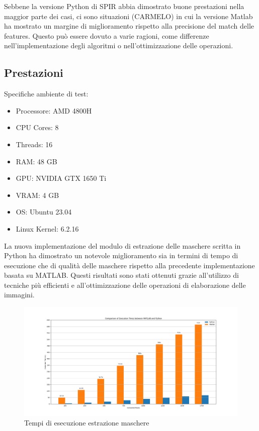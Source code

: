 \documentclass[a4paper,12pt]{report}
\begin{document}
    Sebbene la versione Python di SPIR abbia dimostrato buone prestazioni nella maggior parte dei casi, ci sono situazioni (CARMELO) in cui la versione Matlab ha mostrato un margine di miglioramento rispetto alla precisione del match delle features. Questo può essere dovuto a varie ragioni, come differenze nell'implementazione degli algoritmi o nell'ottimizzazione delle operazioni.
    
    \newpage
    \subsection{Prestazioni}
    Specifiche ambiente di test:

    \begin{itemize}
      \item Processore: AMD 4800H
      \item CPU Cores: 8
      \item Threads: 16
      \item RAM: 48 GB
      \item GPU: NVIDIA GTX 1650 Ti
      \item VRAM: 4 GB
      \item OS: Ubuntu 23.04
      \item Linux Kernel: 6.2.16
    \end{itemize}

    La nuova implementazione del modulo di estrazione delle maschere scritta in Python ha dimostrato un notevole miglioramento sia in termini di tempo di esecuzione che di qualità delle maschere rispetto alla precedente implementazione basata su MATLAB. Questi risultati sono stati ottenuti grazie all'utilizzo di tecniche più efficienti e all'ottimizzazione delle operazioni di elaborazione delle immagini.

    \begin{figure}[H]
      \centering
      \includegraphics[width=\textwidth]{assets/images/results/result_execution_time.png}   
      \caption{Tempi di esecuzione estrazione maschere}
    \end{figure}
    
\end{document}
